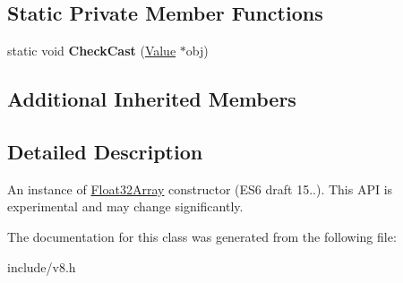 \subsection*{Static Private Member Functions}
\begin{DoxyCompactItemize}
\item 
static void {\bfseries Check\+Cast} (\hyperlink{classv8_1_1_value}{Value} $\ast$obj)\hypertarget{classv8_1_1_float32_array_a5b68fdb621cc7e0483b652c8d49133b2}{}\label{classv8_1_1_float32_array_a5b68fdb621cc7e0483b652c8d49133b2}

\end{DoxyCompactItemize}
\subsection*{Additional Inherited Members}


\subsection{Detailed Description}
An instance of \hyperlink{classv8_1_1_float32_array}{Float32\+Array} constructor (E\+S6 draft 15..). This A\+PI is experimental and may change significantly. 

The documentation for this class was generated from the following file\+:\begin{DoxyCompactItemize}
\item 
include/v8.\+h\end{DoxyCompactItemize}
